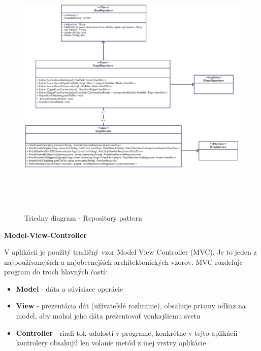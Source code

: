 \documentclass[slovak,master,public,dept460,male,cpdeclaration,oneside]{diploma}
\begin{document}
\begin{figure}[H]
\centering
\includegraphics[width=15cm, height=13cm]{figures/diagram_class}
\caption{Triedny diagram - Repository pattern}
\end{figure}



\noindent \textbf{Model-View-Controller} \cite{modelviewcontroller}


V aplikácii je použitý tradičný vzor Model View Controller (MVC). Je to jeden z najpoužívanejších a najobecnejších architektonických vzorov. MVC rozdeľuje program do troch hlavných častí:
\begin{itemize}
\item \textbf{Model} - dáta a súvisiace operácie 
\item \textbf{View} - prezentácia dát (užívateľslé rozhranie), obsahuje priamy odkaz na model, aby mohol jeho dáta prezentovať vonkajšiemu svetu
\item \textbf{Controller} - riadi tok udalostí v programe, konkrétne v tejto aplikácii kontrolery obsahujú len volanie metód z inej vrstvy aplikácie
\end{itemize}
\end{document}
